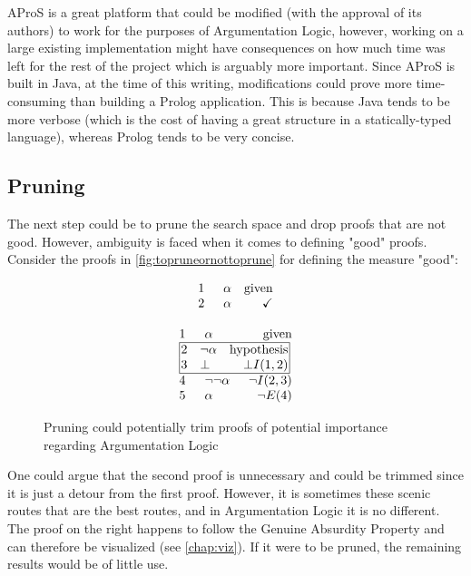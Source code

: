 \documentclass[11pt,twoside,a4paper]{report}
\begin{document}
AProS is a great platform that could be modified (with the approval of its authors) to work for the purposes of Argumentation Logic, however, working on a large existing implementation might have consequences on how much time was left for the rest of the project which is arguably more important. Since AProS is built in Java, at the time of this writing, modifications could prove more time-consuming than building a Prolog application. This is because Java tends to be more verbose (which is the cost of having a great structure in a statically-typed language), whereas Prolog tends to be very concise.

\subsection{Pruning}
The next step could be to prune the search space and drop proofs that are not good. However, ambiguity is faced when it comes to defining "good" proofs. Consider the proofs in \autoref{fig:topruneornottoprune} for defining the measure "good":

\begin{figure}[htp]
\begin{minipage}[c]{.5\linewidth}
\[\vbox{\offinterlineskip\halign{
&\tabskip=1.5em#\strut&$#$\hfil\tabskip=1em&\hfil$#$\tabskip=0em\cr
%
1&\alpha&\mbox{given}\cr
2&\alpha&\checkmark\cr
}}\]
\end{minipage}%
\begin{minipage}[c]{.5\linewidth}
\[\vbox{\offinterlineskip\halign{
&\tabskip=1.5em#\strut&$#$\hfil\tabskip=1em&\hfil$#$\tabskip=0em\cr
%
1&\alpha&\mbox{given}\cr
%
\multispan3\vbox{\halign{
\vrule#&&\hskip.1em\tabskip=1em#\strut&$#$\hfil\tabskip=1em&\hfil$#$\hskip0.1em\tabskip=0em&\vrule#\cr
\noalign{\hrule}
%
&2&\neg\alpha&\mbox{hypothesis}&\cr
&3&\bot&\bot I(1,2)&\cr
%
\noalign{\hrule}}}\,\cr
%
4&\neg\neg\alpha&\neg I(2,3)\cr
5&\alpha&\neg E(4)\cr
}}\]
\end{minipage}

\caption{Pruning could potentially trim proofs of potential importance regarding Argumentation Logic\label{fig:topruneornottoprune}}
\end{figure}

One could argue that the second proof is unnecessary and could be trimmed since it is just a detour from the first proof. However, it is sometimes these scenic routes that are the best routes, and in Argumentation Logic it is no different. The proof on the right happens to follow the Genuine Absurdity Property and can therefore be visualized (see \autoref{chap:viz}). If it were to be pruned, the remaining results would be of little use.
\end{document}
